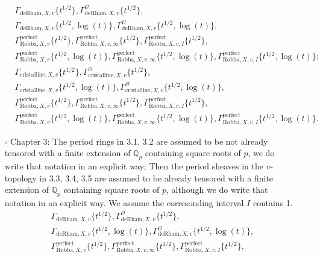 \documentclass[12pt]{book}
\theoremstyle{definition}
\begin{document}
\begin{itemize}
\begin{align}
&\Gamma_{\text{deRham},X,v}\{t^{1/2}\},\Gamma^\mathcal{O}_{\text{deRham},X,v}\{t^{1/2}\},\\
&\Gamma_{\text{deRham},X,v}\{t^{1/2},\log(t)\},\Gamma^\mathcal{O}_{\text{deRham},X,v}\{t^{1/2},\log(t)\},\\
&\Gamma^\mathrm{perfect}_{\text{Robba},X,v}\{t^{1/2}\},\Gamma^\mathrm{perfect}_{\text{Robba},X,v,\infty}\{t^{1/2}\},\Gamma^\mathrm{perfect}_{\text{Robba},X,v,I}\{t^{1/2}\},\\
&\Gamma^\mathrm{perfect}_{\text{Robba},X,v}\{t^{1/2},\log(t)\},\Gamma^\mathrm{perfect}_{\text{Robba},X,v,\infty}\{t^{1/2},\log(t)\},\Gamma^\mathrm{perfect}_{\text{Robba},X,v,I}\{t^{1/2},\log(t)\};
\end{align}
\begin{align}
&\Gamma_{\text{cristalline},X,v}\{t^{1/2}\},\Gamma^\mathcal{O}_{\text{cristalline},X,v}\{t^{1/2}\},\\
&\Gamma_{\text{cristalline},X,v}\{t^{1/2},\log(t)\},\Gamma^\mathcal{O}_{\text{cristalline},X,v}\{t^{1/2},\log(t)\},\\
&\Gamma^\mathrm{perfect}_{\text{Robba},X,v}\{t^{1/2}\},\Gamma^\mathrm{perfect}_{\text{Robba},X,v,\infty}\{t^{1/2}\},\Gamma^\mathrm{perfect}_{\text{Robba},X,v,I}\{t^{1/2}\},\\
&\Gamma^\mathrm{perfect}_{\text{Robba},X,v}\{t^{1/2},\log(t)\},\Gamma^\mathrm{perfect}_{\text{Robba},X,v,\infty}\{t^{1/2},\log(t)\},\Gamma^\mathrm{perfect}_{\text{Robba},X,v,I}\{t^{1/2},\log(t)\}.
\end{align}
\item[$\square$] Chapter 3: The period rings in 3.1, 3.2 are assumed to be not already tensored with a finite extension of $\mathbb{Q}_p$ containing square roots of $p$,  we do write that notation in an explicit way; Then the period sheaves in the $v$-topology in 3.3, 3.4, 3.5 are assumed to be already tensored with a finite extension of $\mathbb{Q}_p$ containing square roots of $p$, although we do write that notation in an explicit way. We assume the corresonding interval $I$ contains 1.
\begin{align}
&\Gamma_{\text{deRham},X,v}\{t^{1/2}\},\Gamma^\mathcal{O}_{\text{deRham},X,v}\{t^{1/2}\},\\
&\Gamma_{\text{deRham},X,v}\{t^{1/2},\log(t)\},\Gamma^\mathcal{O}_{\text{deRham},X,v}\{t^{1/2},\log(t)\},\\
&\Gamma^\mathrm{perfect}_{\text{Robba},X,v}\{t^{1/2}\},\Gamma^\mathrm{perfect}_{\text{Robba},X,v,\infty}\{t^{1/2}\},\Gamma^\mathrm{perfect}_{\text{Robba},X,v,I}\{t^{1/2}\},\\

\end{align}
\end{itemize}
\end{document}
